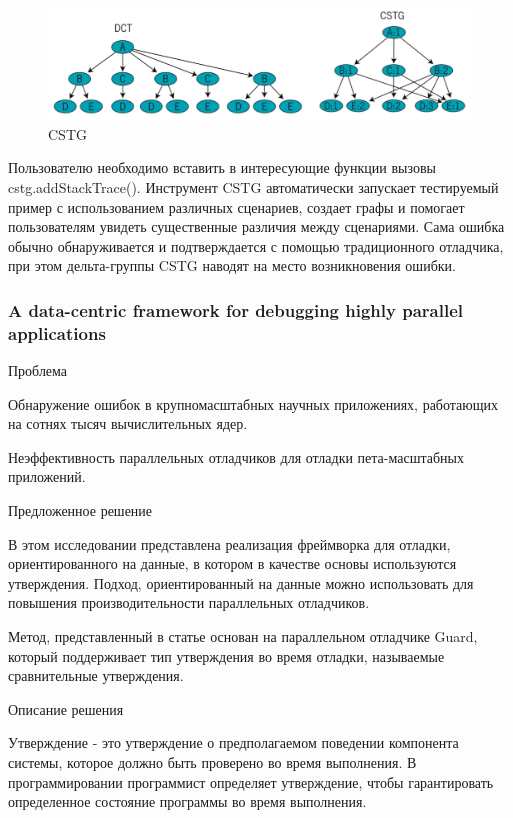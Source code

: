 \begin{figure}[h]
	\centering
	\includegraphics[width=1\textwidth]{ResearchNotes/rndhpc_not_edt_2021_11_10/krekhtunova/cstg2.png}
	\caption{CSTG} 
\end{figure}

Пользователю необходимо вставить в интересующие функции вызовы cstg.addStackTrace(). Инструмент CSTG автоматически запускает тестируемый пример с использованием различных сценариев, создает графы и помогает пользователям увидеть существенные различия между сценариями. Сама ошибка обычно обнаруживается и подтверждается с помощью традиционного отладчика, при этом дельта-группы CSTG наводят на место возникновения ошибки.

\subsubsection{A data-centric framework for debugging highly parallel applications}

Проблема

Обнаружение ошибок в крупномасштабных научных приложениях, работающих на сотнях тысяч вычислительных ядер.

Неэффективность параллельных отладчиков для отладки пета-масштабных приложений.
\newline

Предложенное решение

В этом исследовании представлена реализация фреймворка для отладки, ориентированного на данные, в котором в качестве основы используются утверждения.
Подход, ориентированный на данные можно использовать для повышения производительности параллельных отладчиков. 

Метод, представленный в статье основан на параллельном отладчике Guard, который поддерживает тип утверждения во время отладки, называемые сравнительные утверждения. 
\newline

Описание решения

Утверждение - это утверждение о предполагаемом поведении компонента системы, которое должно быть проверено во время выполнения. В программировании программист определяет утверждение, чтобы гарантировать определенное состояние программы во время выполнения.

